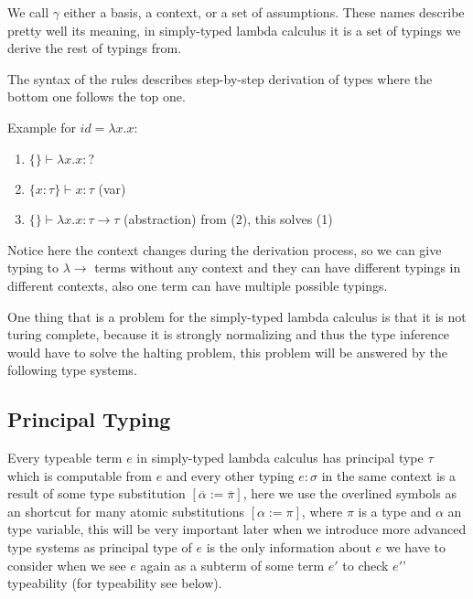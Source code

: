 We call $\gamma$ either a basis, a context, or a set of assumptions. These names describe pretty well its meaning, in simply-typed lambda calculus it
is a set of typings we derive the rest of typings from.

The syntax of the rules describes step-by-step derivation of types where the bottom one follows the top one.

Example for $id = \lambda x . x$:

\begin{enumerate}
    \item $\{\} \vdash \lambda x . x : ?$
    \item $\{x : \tau\} \vdash x : \tau$ (var)
    \item $\{\} \vdash \lambda x . x : \tau \rightarrow \tau$ (abstraction) from (2), this solves (1)
\end{enumerate}

Notice here the context changes during the derivation process, so we can give typing to $\lambda\rightarrow$ terms without any context
and they can have different typings in different contexts, also one term can have multiple possible typings.


One thing that is a problem for the simply-typed lambda calculus is that it is not turing complete, %
because it is strongly normalizing and thus the type inference would have to solve the halting problem,
this problem will be answered by the following type systems.

\subsection{Principal Typing}

Every typeable term $e$ in simply-typed lambda calculus has principal type $\tau$ which is computable from $e$ and every other typing
$e : \sigma$ in the same context is a result of some type substitution $[\overline{\alpha} := \overline{\pi}]$, here we use the overlined symbols
as an shortcut for many atomic substitutions $[\alpha := \pi]$, where $\pi$ is a type and $\alpha$ an type variable, this will be very important
later when we introduce more advanced type systems as principal type of $e$ is the only information about $e$ we have to consider
when we see $e$ again as a subterm of some term $e'$ to check $e'$' typeability (for typeability see below). %

